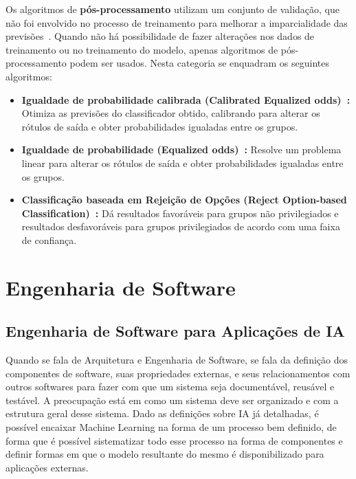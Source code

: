 \documentclass[portugues]{ic-tese}
\begin{document}
Os algoritmos de \textbf{pós-processamento} utilizam um conjunto de validação, que não foi envolvido no processo de treinamento para melhorar a imparcialidade das previsões~\citep{dAlessandro_2017}. Quando não há possibilidade de fazer alterações nos dados de treinamento ou no treinamento do modelo, apenas algoritmos de pós-processamento podem ser usados. Nesta categoria se enquadram os seguintes algoritmos:

\begin{itemize}
\item \textbf{Igualdade de probabilidade calibrada (Calibrated Equalized odds)~\citep{Pleiss_2017}:} Otimiza as previsões do classificador obtido, calibrando para alterar os rótulos de saída e obter probabilidades igualadas entre os grupos.

\item \textbf{Igualdade de probabilidade (Equalized odds)~\citep{Hardt_2016}:} Resolve um problema linear para alterar os rótulos de saída e obter probabilidades igualadas entre os grupos.

\item \textbf{Classificação baseada em Rejeição de Opções (Reject Option-based Classification)~\citep{Kamiran_2012}:} Dá resultados favoráveis para grupos não privilegiados e resultados desfavoráveis para grupos privilegiados de acordo com uma faixa de confiança.

\end{itemize}

\section{Engenharia de Software}

\subsection{Engenharia de Software para Aplicações de IA}

Quando se fala de Arquitetura e Engenharia de Software, se fala da definição dos componentes de software, suas propriedades externas, e seus relacionamentos com outros softwares para fazer com que um sistema seja documentável, reusável e testável. A preocupação está em como um sistema deve ser organizado e com a estrutura geral desse sistema. Dado as definições sobre IA já detalhadas, é possível encaixar Machine Learning na forma de um processo bem definido, de forma que é possível sistematizar todo esse processo na forma de componentes e definir formas em que o modelo resultante do mesmo é disponibilizado para aplicações externas.
\end{document}
